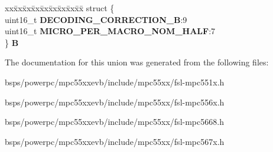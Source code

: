 \begin{DoxyCompactItemize}
\begin{tabbing}
\end{tabbing}\item 
\mbox{\label{unionuPCR7_a1c5a76f38dc8ed662d83d01ab9ac52c9}} 
\begin{tabbing}
xx\=xx\=xx\=xx\=xx\=xx\=xx\=xx\=xx\=\kill
struct \{\\
\>uint16\_t {\bfseries DECODING\_CORRECTION\_B}:9\\
\>uint16\_t {\bfseries MICRO\_PER\_MACRO\_NOM\_HALF}:7\\
\} {\bfseries B}\\

\end{tabbing}\end{DoxyCompactItemize}


The documentation for this union was generated from the following files\+:\begin{DoxyCompactItemize}
\item 
bsps/powerpc/mpc55xxevb/include/mpc55xx/fsl-\/mpc551x.\+h\item 
bsps/powerpc/mpc55xxevb/include/mpc55xx/fsl-\/mpc556x.\+h\item 
bsps/powerpc/mpc55xxevb/include/mpc55xx/fsl-\/mpc5668.\+h\item 
bsps/powerpc/mpc55xxevb/include/mpc55xx/fsl-\/mpc567x.\+h\end{DoxyCompactItemize}
